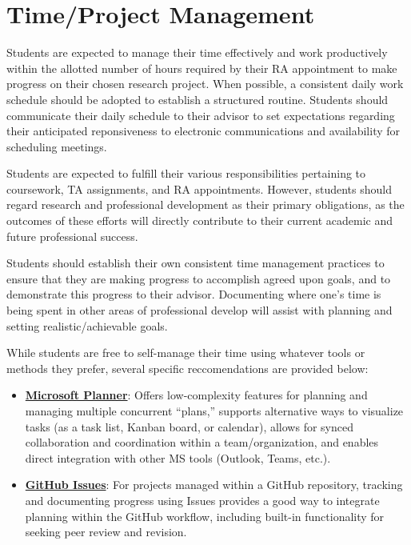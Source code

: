 \documentclass[12pt,a4paper,article,oneside]{memoir} %
\begin{document}
\section{Time/Project Management}

Students are expected to manage their time effectively and work productively within the allotted number of hours required by their RA appointment to make progress on their chosen research project. When possible, a consistent daily work schedule should be adopted to establish a structured routine. Students should communicate their daily schedule to their advisor to set expectations regarding their anticipated reponsiveness to electronic communications and availability for scheduling meetings.

Students are expected to fulfill their various responsibilities pertaining to coursework, TA assignments, and RA appointments. However, students should regard research and professional development as their primary obligations, as the outcomes of these efforts will directly contribute to their current academic and future professional success.

Students should establish their own consistent time management practices to ensure that they are making progress to accomplish agreed upon goals, and to demonstrate this progress to their advisor. Documenting where one's time is being spent in other areas of professional develop will assist with planning and setting realistic/achievable goals.

While students are free to self-manage their time using whatever tools or methods they prefer, several specific reccomendations are provided below:
\begin{itemize}
\item \href{https://planner.cloud.microsoft}{\textbf{Microsoft Planner}}: Offers low-complexity features for planning and managing multiple concurrent ``plans,'' supports alternative ways to visualize tasks (as a task list, Kanban board, or calendar), allows for synced collaboration and coordination within a team/organization, and enables direct integration with other MS tools (Outlook, Teams, etc.).
\item \href{https://docs.github.com/en/issues/tracking-your-work-with-issues/about-issues}{\textbf{GitHub Issues}}: For projects managed within a GitHub repository, tracking and documenting progress using Issues provides a good way to integrate planning within the GitHub workflow, including built-in functionality for seeking peer review and revision.
\end{itemize}
\end{document}
